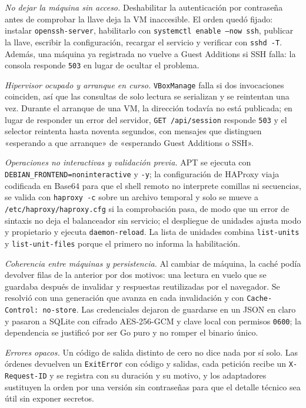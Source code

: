 \emph{No dejar la máquina sin acceso.} Deshabilitar la autenticación por
contraseña antes de comprobar la llave deja la VM inaccesible. El orden
quedó fijado: instalar \texttt{openssh-server}, habilitarlo con
\texttt{systemctl enable --now ssh}, publicar la llave, escribir la
configuración, recargar el servicio y verificar con \texttt{sshd -T}.
Además, una máquina ya registrada no vuelve a Guest Additions si SSH
falla: la consola responde \texttt{503} en lugar de ocultar el problema.

\emph{Hipervisor ocupado y arranque en curso.} \texttt{VBoxManage} falla
si dos invocaciones coinciden, así que las consultas de solo lectura se
serializan y se reintentan una vez. Durante el arranque de una VM, la
dirección todavía no está publicada; en lugar de responder un error del
servidor, \texttt{GET /api/session} responde \texttt{503} y el selector
reintenta hasta noventa segundos, con mensajes que distinguen «esperando
a que arranque» de «esperando Guest Additions o SSH».

\emph{Operaciones no interactivas y validación previa.} APT se ejecuta
con \texttt{DEBIAN\_FRONTEND=noninteractive} y \texttt{-y}; la
configuración de HAProxy viaja codificada en Base64 para que el shell
remoto no interprete comillas ni secuencias, se valida con
\texttt{haproxy -c} sobre un archivo temporal y solo se mueve a
\texttt{/etc/haproxy/haproxy.cfg} si la comprobación pasa, de modo que
un error de sintaxis no deja el balanceador sin servicio; el despliegue
de unidades ajusta modo y propietario y ejecuta \texttt{daemon-reload}.
La lista de unidades combina \texttt{list-units} y
\texttt{list-unit-files} porque el primero no informa la habilitación.

\emph{Coherencia entre máquinas y persistencia.} Al cambiar de máquina,
la caché podía devolver filas de la anterior por dos motivos: una lectura
en vuelo que se guardaba después de invalidar y respuestas reutilizadas
por el navegador. Se resolvió con una generación que avanza en cada
invalidación y con \texttt{Cache-Control: no-store}. Las credenciales
dejaron de guardarse en un JSON en claro y pasaron a SQLite con cifrado
AES-256-GCM y clave local con permisos \texttt{0600}; la dependencia se
justificó por ser Go puro y no romper el binario único.

\emph{Errores opacos.} Un código de salida distinto de cero no dice nada
por sí solo. Las órdenes devuelven un \texttt{ExitError} con código y
salidas, cada petición recibe un \texttt{X-Request-ID} y se registra con
su duración y su motivo, y los adaptadores sustituyen la orden por una
versión sin contraseñas para que el detalle técnico sea útil sin exponer
secretos.

